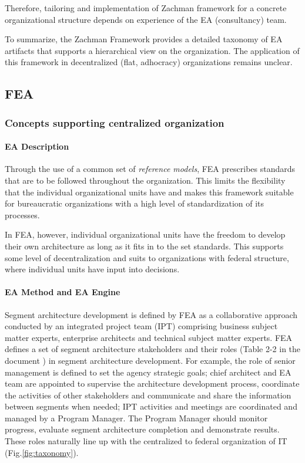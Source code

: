 Therefore, tailoring and  implementation of Zachman framework for a concrete organizational structure depends on experience of the EA (consultancy) team.

To summarize, the Zachman Framework provides a detailed taxonomy of EA artifacts that supports a hierarchical view on the organization. The application of this framework in decentralized (flat, adhocracy) organizations remains unclear.

\subsection{FEA}
\subsubsection{Concepts supporting centralized organization}
\paragraph*{EA Description}
Through the use of a common set of \textit{reference models}, FEA prescribes standards that are to be followed throughout the organization. This limits the flexibility that the individual organizational units have and makes this framework suitable for bureaucratic organizations with a high level of standardization of its processes.

In FEA, however, individual organizational units have the freedom to develop their own architecture as long as it fits in to the set standards. This supports some level of decentralization and suits to organizations with federal structure, where individual units have input into decisions. 

\paragraph*{EA Method and EA Engine}

Segment architecture development is defined by FEA as a collaborative approach conducted by an integrated project team (IPT) comprising business subject matter experts, enterprise architects and technical subject matter experts.  FEA defines a set of segment architecture stakeholders and their roles (Table 2-2 in the document \cite{FEA_PMO2007}) in segment architecture development.   For example, the role of senior management is defined to set the agency strategic goals; chief architect and EA team are appointed to supervise the architecture development process, coordinate the activities of other stakeholders and communicate and share the information between segments when needed; IPT activities and meetings are coordinated and managed by a Program Manager. The Program Manager should monitor progress, evaluate segment architecture completion and demonstrate results. These roles naturally line up with the centralized to federal organization of IT (Fig.\ref{fig:taxonomy}).

